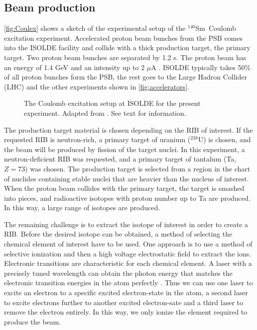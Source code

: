 \documentclass[twoside,english]{uiofysmaster/uiofysmaster}
\newcommand{\Sm}{$^{140}$Sm} %
\let\orgautoref\autoref
\renewcommand{\autoref}
        {%
		 \def\sectionautorefname{Section}%
		 \def\subsectionautorefname{Section}%
		 \def\subsubsectionautorefname{Section}%
		 \def\chapterautorefname{Chapter}%
          \orgautoref}
\begin{document}
\subsection{Beam production}
\autoref{fig:Coulex} shows a sketch of the experimental setup of the \Sm\ Coulomb excitation experiment. 
Accelerated proton beam bunches from the PSB comes into the ISOLDE facility and collide with a thick production target, the primary target. 
Two proton beam bunches are separated by 1.2 s.
The proton beam has an energy of 1.4 GeV and an intensity up to 2 $\mu$A \cite{TIF, TIF2013}. 
ISOLDE typically takes 50\% \cite{MB-spect} of all proton bunches form the PSB, the rest goes to the Large Hadron Collider (LHC) and the other experiments shown in \autoref{fig:accelerators}. 

\begin{figure}[ht]
	\centering
	
	\caption{The Coulomb excitation setup at ISOLDE for the present experiment. Adapted from \cite{Klintefjord}. See text for information.}
	\label{fig:Coulex}
\end{figure}

The production target material is chosen depending on the RIB of interest. 
If the requested RIB is neutron-rich, a primary target of uranium ($^{238}$U) is chosen, and the beam will be produced by fission of the target nuclei.
In this experiment, a neutron-deficient RIB was requested, and a primary target of tantalum (Ta, $Z = 73$) was chosen.
The production target is selected from a region in the chart of nuclides containing stable nuclei that are heavier than the nucleus of interest.
When the proton beam collides with the primary target, the target is smashed into pieces, and radioactive isotopes with proton number up to Ta are produced.
In this way, a large range of isotopes are produced. 

The remaining challenge is to extract the isotope of interest in order to create a RIB. 
Before the desired isotope can be obtained, a method of selecting the chemical element of interest have to be used.
One approach is to use a method of selective ionization and then a high voltage electrostatic field to extract the ions. 
Electronic transitions are characteristic for each chemical element. 
A laser with a precisely tuned wavelength can obtain the photon energy that matches the electronic transition energies in the atom perfectly \cite{RILIS-web, RILIS2013}. 
Thus we can use one laser to excite an electron to a specific excited electron-state in the atom, a second laser to excite electrons further to another excited electron-sate and a third laser to remove the electron entirely. 
In this way, we only ionize the element required to produce the beam. 
\end{document}
